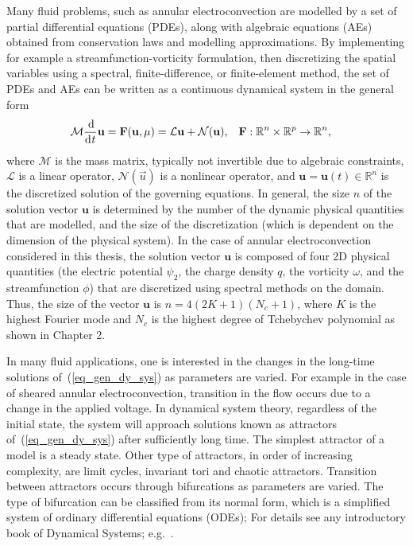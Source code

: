 Many fluid problems, such as annular electroconvection are modelled  by a set of partial differential equations (PDEs), along with algebraic equations (AEs) obtained from conservation laws and modelling approximations. By implementing for example a streamfunction-vorticity formulation, then discretizing the spatial variables using  a spectral, finite-difference, or finite-element method, the set of PDEs and AEs can be written as a continuous dynamical system in the general form
\begin{align}
\label{eq_gen_dy_sys}
&\mathcal{M}\deriv[]{}{t}\vec{u} = \vec{F}(\vec{u},\mu) = \mathcal{L}\vec{u} +\mathcal{N}(\vec{u}), &
&\mathbf{F}: \mathbb{R}^n\times\mathbb{R}^p\rightarrow\mathbb{R}^n,
\end{align}
where $\mathcal{M}$ is the mass matrix, typically not invertible due to algebraic constraints, $\mathcal{L}$ is a linear operator, $\mathcal{N}(\vec{u})$ is a nonlinear operator, and $\mathbf{u}=\mathbf{u}(t) \in \mathbb{R}^n$ is the discretized solution of the governing equations. In general, the size $n$ of the solution vector $\mathbf{u}$  is determined by
the number of the dynamic physical quantities that are modelled, and the size of the discretization (which is dependent on the dimension of the physical system). In the case of annular electroconvection considered in this thesis, the solution vector $\mathbf{u}$ is composed of four 2D physical quantities (the electric potential $\psi_2$, the charge density $q$, the vorticity $\omega$, and the streamfunction $\phi$) that are discretized using spectral methods on the domain. Thus, the size of the vector $\mathbf{u}$ is $n = 4(2K+1)(N_c+1)$,  where $K$ is the highest Fourier mode and $N_c$ is the highest degree of Tchebychev polynomial as shown in Chapter 2.

In many fluid applications, one is interested in the changes in the long-time solutions of~(\ref{eq_gen_dy_sys}) as parameters are varied. For example in the case of sheared annular electroconvection, transition in the flow occurs due to a change in the applied voltage. In dynamical system theory, regardless of the initial state, the system will approach solutions known as attractors of~(\ref{eq_gen_dy_sys}) after sufficiently long time. The simplest attractor of a model is a steady state. Other type of attractors, in order of increasing complexity, are limit cycles, invariant tori and chaotic attractors. Transition between attractors occurs through bifurcations as parameters are varied. The type of bifurcation can be classified from its normal form, which is a simplified system of ordinary differential equations (ODEs); For details see any introductory book of Dynamical Systems; e.g.~\cite{strogatz2014}.

